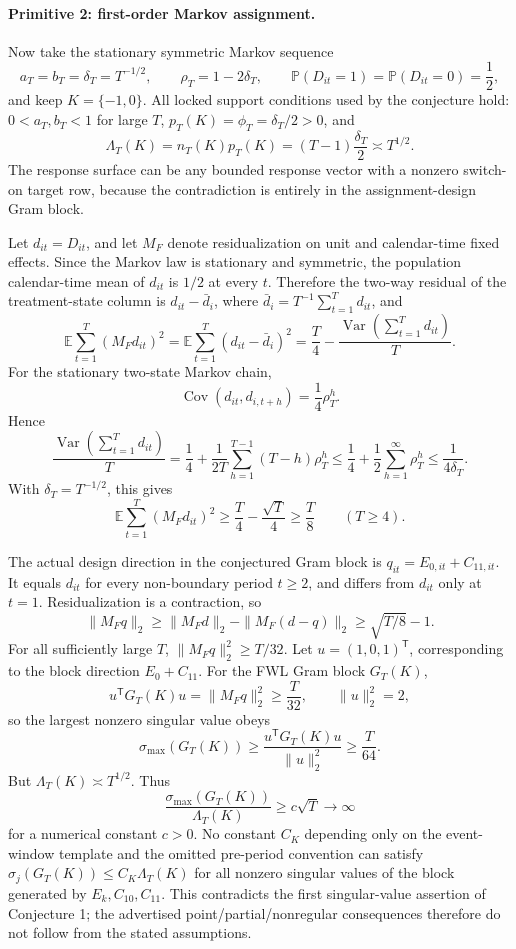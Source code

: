 \documentclass[11pt]{article}
\newcommand{\E}{\mathbb{E}}
\renewcommand{\Pr}{\mathbb{P}}
\newcommand{\transpose}{\mathsf{T}}
\theoremstyle{definition}
\theoremstyle{plain}
\theoremstyle{remark}
\begin{document}
\paragraph{Primitive 2: first-order Markov assignment.}
Now take the stationary symmetric Markov sequence
\[
a_T=b_T=\delta_T=T^{-1/2},\qquad
\rho_T=1-2\delta_T,\qquad
\Pr(D_{it}=1)=\Pr(D_{it}=0)=\frac12,
\]
and keep \(K=\{-1,0\}\).
All locked support conditions used by the conjecture hold: \(0<a_T,b_T<1\) for large \(T\), \(p_T(K)=\phi_T=\delta_T/2>0\), and
\[
\Lambda_T(K)=n_T(K)p_T(K)=(T-1)\frac{\delta_T}{2}\asymp T^{1/2}.
\]
The response surface can be any bounded response vector with a nonzero switch-on target row, because the contradiction is entirely in the assignment-design Gram block.

Let \(d_{it}=D_{it}\), and let \(M_F\) denote residualization on unit and calendar-time fixed effects.
Since the Markov law is stationary and symmetric, the population calendar-time mean of \(d_{it}\) is \(1/2\) at every \(t\).
Therefore the two-way residual of the treatment-state column is \(d_{it}-\bar d_i\), where \(\bar d_i=T^{-1}\sum_{t=1}^T d_{it}\), and
\[
\E\sum_{t=1}^T (M_F d_{it})^2
=
\E\sum_{t=1}^T (d_{it}-\bar d_i)^2
=
\frac{T}{4}-\frac{\operatorname{Var}\!\left(\sum_{t=1}^T d_{it}\right)}{T}.
\]
For the stationary two-state Markov chain,
\[
\operatorname{Cov}(d_{it},d_{i,t+h})=\frac14\rho_T^h.
\]
Hence
\[
\frac{\operatorname{Var}\!\left(\sum_{t=1}^T d_{it}\right)}{T}
=
\frac14+\frac{1}{2T}\sum_{h=1}^{T-1}(T-h)\rho_T^h
\le
\frac14+\frac12\sum_{h=1}^{\infty}\rho_T^h
\le
\frac{1}{4\delta_T}.
\]
With \(\delta_T=T^{-1/2}\), this gives
\[
\E\sum_{t=1}^T (M_F d_{it})^2
\ge
\frac{T}{4}-\frac{\sqrt T}{4}
\ge
\frac{T}{8}
\qquad (T\ge4).
\]

The actual design direction in the conjectured Gram block is \(q_{it}=E_{0,it}+C_{11,it}\).
It equals \(d_{it}\) for every non-boundary period \(t\ge2\), and differs from \(d_{it}\) only at \(t=1\).
Residualization is a contraction, so
\[
\|M_F q\|_2
\ge
\|M_F d\|_2-\|M_F(d-q)\|_2
\ge
\sqrt{T/8}-1.
\]
For all sufficiently large \(T\), \(\|M_F q\|_2^2\ge T/32\).
Let \(u=(1,0,1)^\transpose\), corresponding to the block direction \(E_0+C_{11}\).
For the FWL Gram block \(G_T(K)\),
\[
u^\transpose G_T(K)u=\|M_F q\|_2^2\ge \frac{T}{32},
\qquad
\|u\|_2^2=2,
\]
so the largest nonzero singular value obeys
\[
\sigma_{\max}(G_T(K))\ge \frac{u^\transpose G_T(K)u}{\|u\|_2^2}\ge \frac{T}{64}.
\]
But \(\Lambda_T(K)\asymp T^{1/2}\).
Thus
\[
\frac{\sigma_{\max}(G_T(K))}{\Lambda_T(K)}
\ge c\sqrt T\to\infty
\]
for a numerical constant \(c>0\).
No constant \(C_K\) depending only on the event-window template and the omitted pre-period convention can satisfy \(\sigma_j(G_T(K))\le C_K\Lambda_T(K)\) for all nonzero singular values of the block generated by \(E_k,C_{10},C_{11}\).
This contradicts the first singular-value assertion of Conjecture 1; the advertised point/partial/nonregular consequences therefore do not follow from the stated assumptions.
\end{document}
